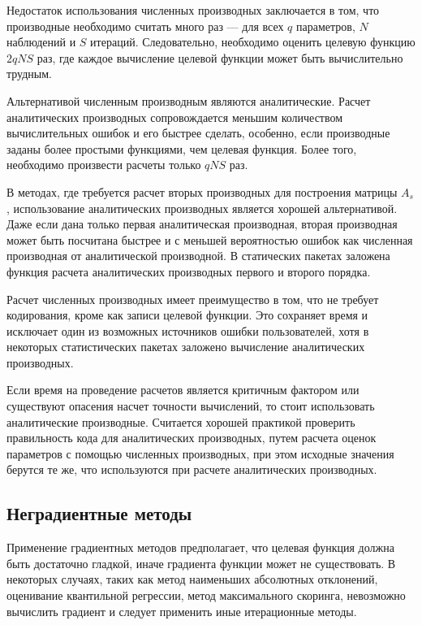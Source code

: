 Недостаток использования численных производных заключается в том, что производные необходимо считать много раз --- для всех $q$ параметров, $N$ наблюдений и $S$ итераций. Следовательно, необходимо оценить целевую функцию $2qNS$ раз, где каждое вычисление целевой функции может быть вычислительно трудным.

Альтернативой численным производным являются аналитические. Расчет аналитических производных сопровождается меньшим количеством вычислительных ошибок и его быстрее сделать, особенно, если производные заданы более простыми функциями, чем целевая функция. Более того, необходимо произвести расчеты только $qNS$ раз.

В методах, где требуется расчет вторых производных для построения матрицы $A_s$, использование аналитических производных является хорошей альтернативой. Даже если дана только первая аналитическая производная, вторая производная может быть посчитана быстрее и с меньшей вероятностью ошибок как численная производная от аналитической производной. В статических пакетах заложена функция расчета аналитических производных первого и второго порядка.

Расчет численных производных имеет преимущество в том, что не требует кодирования, кроме как записи целевой функции. Это сохраняет время и исключает один из возможных источников ошибки пользователей, хотя в некоторых статистических пакетах заложено вычисление аналитических производных.

Если время на проведение расчетов является критичным фактором или существуют опасения насчет точности вычислений, то стоит использовать аналитические производные. Считается хорошей практикой проверить правильность кода для аналитических производных, путем расчета оценок параметров с помощью численных производных, при этом исходные значения берутся те же, что используются при расчете аналитических производных.

\subsection{Неградиентные методы}

Применение градиентных  методов предполагает, что целевая функция должна быть достаточно гладкой, иначе градиента функции может не существовать. В некоторых случаях, таких как метод наименьших абсолютных отклонений, оценивание квантильной регрессии, метод максимального скоринга, невозможно вычислить градиент и следует применить иные итерационные методы.

